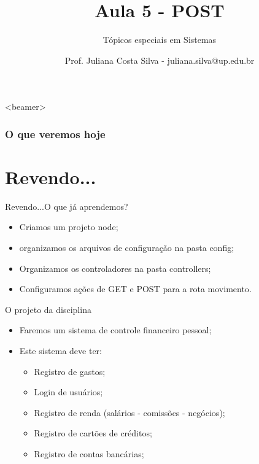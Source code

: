 \documentclass{beamer}
\title{Aula 5  - POST}
\subtitle{Tópicos especiais em Sistemas}
\author{Prof. Juliana Costa Silva - juliana.silva@up.edu.br}
\begin{document}
  \frame[c]{\maketitle}
      \begin{frame}<beamer>
      \frametitle{O que veremos hoje}
      \tableofcontents
    \end{frame}
    \section{Revendo...}
    \begin{frame}{Revendo...}{O que já aprendemos?}
      
      \begin{itemize}
            \item Criamos um projeto node;
            \item organizamos os arquivos de configuração na pasta config;
            \item Organizamos os controladores na pasta controllers;
            \item Configuramos ações de GET e POST para a rota \alert{movimento}.
       \end{itemize}
     \end{frame}
\begin{frame}[label=proof]{O projeto da disciplina}
	\begin{itemize}
	\item Faremos um sistema de controle financeiro pessoal;
	\item Este sistema deve ter:
	\begin{itemize}
	\item Registro de gastos;
	\item Login de usuários;
	\item Registro de renda (salários - comissões - negócios);
	\item Registro de cartões de créditos;
	\item Registro de contas bancárias;
	\end{itemize}
	\end{itemize}
    \end{frame}
\end{document}
